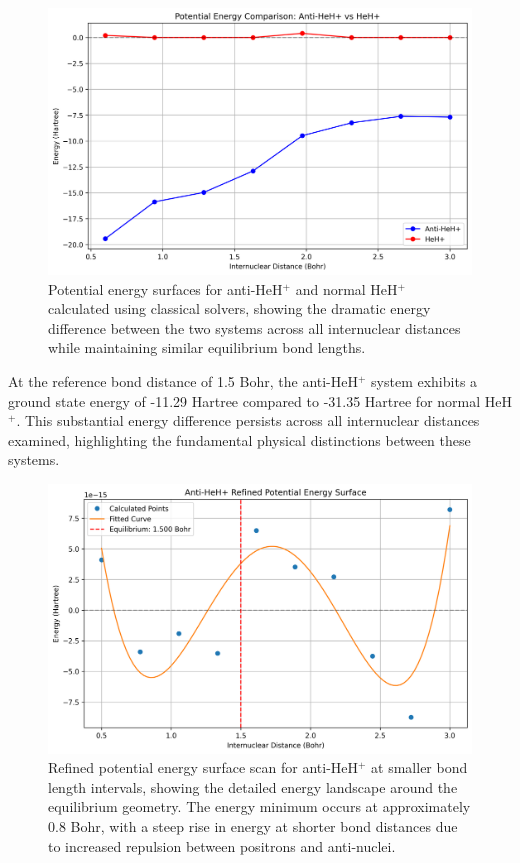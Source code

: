 \documentclass[10pt,twocolumn,a4paper]{article}
\begin{document}
\begin{figure}[t!]
    \centering
    \includegraphics[width=\columnwidth]{graphs/corrected_comparison_pes.png}
    \caption{Potential energy surfaces for anti-HeH$^+$ and normal HeH$^+$ calculated using classical solvers, showing the dramatic energy difference between the two systems across all internuclear distances while maintaining similar equilibrium bond lengths.}
    \label{fig:pes_comparison}
\end{figure}

At the reference bond distance of 1.5 Bohr, the anti-HeH$^+$ system exhibits a ground state energy of -11.29 Hartree compared to -31.35 Hartree for normal HeH$^+$. This substantial energy difference persists across all internuclear distances examined, highlighting the fundamental physical distinctions between these systems.

\begin{figure}[t!]
    \centering
    \includegraphics[width=\columnwidth]{graphs/anti_heh_refined_pes.png}
    \caption{Refined potential energy surface scan for anti-HeH$^+$ at smaller bond length intervals, showing the detailed energy landscape around the equilibrium geometry. The energy minimum occurs at approximately 0.8 Bohr, with a steep rise in energy at shorter bond distances due to increased repulsion between positrons and anti-nuclei.}
    \label{fig:refined_pes}
\end{figure}
\end{document}
